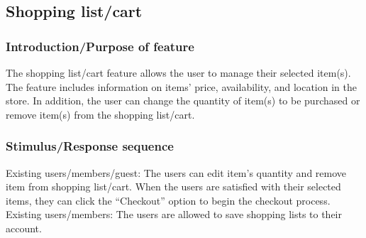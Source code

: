 \documentclass{scrreprt}
\theoremstyle{funreq}
\begin{document}

	\subsection{Shopping list/cart}
	\subsubsection{Introduction/Purpose of feature}
	The shopping list/cart feature allows the user to manage their selected item(s). The feature includes information on items’ price, availability, and location in the store. In addition, the user can change the quantity of item(s) to be purchased or remove item(s) from the shopping list/cart.
	
	\subsubsection{Stimulus/Response sequence}
	Existing users/members/guest:
	The users can edit item’s quantity and remove item from shopping list/cart. When the users are satisfied with their selected items, they can click the “Checkout” option to begin the checkout process. 
	Existing users/members:
	The users are allowed to save shopping lists to their account.
	
	
\end{document}
